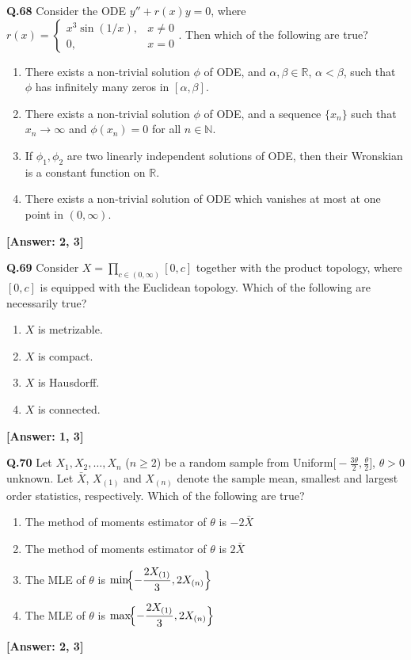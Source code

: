 \documentclass[12pt,a4paper]{article}
\newcommand{\ans}[1]{\quad\textcolor{anscolor}{\textbf{[Answer: #1]}}}
\begin{document}
\textbf{Q.68} Consider the ODE $y''+r(x)y=0$, where $r(x)=\begin{cases}x^3\sin(1/x),&x\neq0\\0,&x=0\end{cases}$. Then which of the following are true?
\begin{enumerate}[label=\arabic*.]
\item There exists a non-trivial solution $\phi$ of ODE, and $\alpha,\beta\in\mathbb{R}$, $\alpha<\beta$, such that $\phi$ has infinitely many zeros in $[\alpha,\beta]$.
\item There exists a non-trivial solution $\phi$ of ODE, and a sequence $\{x_n\}$ such that $x_n\to\infty$ and $\phi(x_n)=0$ for all $n\in\mathbb{N}$.
\item If $\phi_1,\phi_2$ are two linearly independent solutions of ODE, then their Wronskian is a constant function on $\mathbb{R}$.
\item There exists a non-trivial solution of ODE which vanishes at most at one point in $(0,\infty)$.
\end{enumerate}\ans{2, 3}

\textbf{Q.69} Consider $X=\prod_{c\in(0,\infty)}[0,c]$ together with the product topology, where $[0,c]$ is equipped with the Euclidean topology. Which of the following are necessarily true?
\begin{enumerate}[label=\arabic*.]
\item $X$ is metrizable. \item $X$ is compact. \item $X$ is Hausdorff. \item $X$ is connected.
\end{enumerate}\ans{1, 3}

\textbf{Q.70} Let $X_1,X_2,\ldots,X_n$ ($n\ge2$) be a random sample from Uniform$\!\bigl[-\tfrac{3\theta}{2},\tfrac{\theta}{2}\bigr]$, $\theta>0$ unknown. Let $\bar{X}$, $X_{(1)}$ and $X_{(n)}$ denote the sample mean, smallest and largest order statistics, respectively. Which of the following are true?
\begin{enumerate}[label=\arabic*.]
\item The method of moments estimator of $\theta$ is $-2\bar{X}$
\item The method of moments estimator of $\theta$ is $2\bar{X}$
\item The MLE of $\theta$ is $\min\!\Bigl\{-\dfrac{2X_{(1)}}{3},2X_{(n)}\Bigr\}$
\item The MLE of $\theta$ is $\max\!\Bigl\{-\dfrac{2X_{(1)}}{3},2X_{(n)}\Bigr\}$
\end{enumerate}\ans{2, 3}
\end{document}
